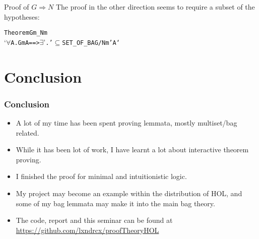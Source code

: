 \documentclass[english,svgnames,hide notes,12pt]{beamer}
\theoremstyle{definition}
\theoremstyle{remark}
\begin{document}
\begin{frame}[fragile]{Proof of $G\Rightarrow N$}
    The proof in the other direction seems to require a subset of the hypotheses:
    \begin{alltt}
Theorem Gm_Nm
`\(\forall\) \textGamma A. Gm \textGamma A ==> \(\exists\) \textGamma'. \textGamma' \(\subseteq\) SET_OF_BAG \textGamma /\bs{} Nm \textGamma' A`
    \end{alltt}
\end{frame}

\section{Conclusion}

\begin{frame}
    \frametitle{Conclusion}
    \begin{itemize}
        \item A lot of my time has been spent proving lemmata, mostly multiset/bag related.
        \item While it has been lot of work, I have learnt a lot about interactive theorem proving.
        \item I finished the proof for minimal and intuitionistic logic.
        \item My project may become an example within the distribution of HOL, and some of my bag lemmata may make it into the main bag theory.
        \item The code, report and this seminar can be found at \url{https://github.com/lxndrcx/proofTheoryHOL}
    \end{itemize}
\end{frame}
\end{document}
